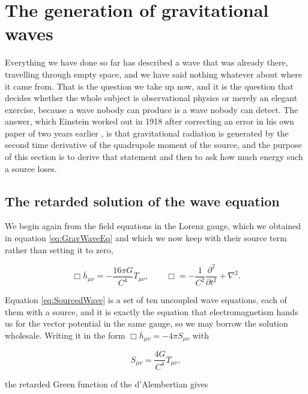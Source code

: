         

\section{The generation of gravitational waves}

    Everything we have done so far has described a wave that was already there, travelling through empty space, and we have said nothing whatever about where it came from. That is the question we take up now, and it is the question that decides whether the whole subject is observational physics or merely an elegant exercise, because a wave nobody can produce is a wave nobody can detect. The answer, which Einstein worked out in 1918 after correcting an error in his own paper of two years earlier \citep{einstein1918}, is that gravitational radiation is generated by the second time derivative of the quadrupole moment of the source, and the purpose of this section is to derive that statement and then to ask how much energy such a source loses.

    \subsection{The retarded solution of the wave equation}

        We begin again from the field equations in the Lorenz gauge, which we obtained in equation \ref{eq:GravWaveEq} and which we now keep with their source term rather than setting it to zero,

        \begin{equation}\label{eq:SourcedWave}
            \Box\overline{h}_{\mu\nu} = -\frac{16\pi G}{C^4}T_{\mu\nu},\qquad \Box = -\frac{1}{C^2}\frac{\partial^2}{\partial t^2} + \nabla^2.
        \end{equation}

        Equation \ref{eq:SourcedWave} is a set of ten uncoupled wave equations, each of them with a source, and it is exactly the equation that electromagnetism hands us for the vector potential in the same gauge, so we may borrow the solution wholesale. Writing it in the form $\Box\overline{h}_{\mu\nu} = -4\pi S_{\mu\nu}$ with

        \begin{equation}
            S_{\mu\nu} = \frac{4G}{C^4}T_{\mu\nu},
        \end{equation}

        the retarded Green function of the d'Alembertian gives

